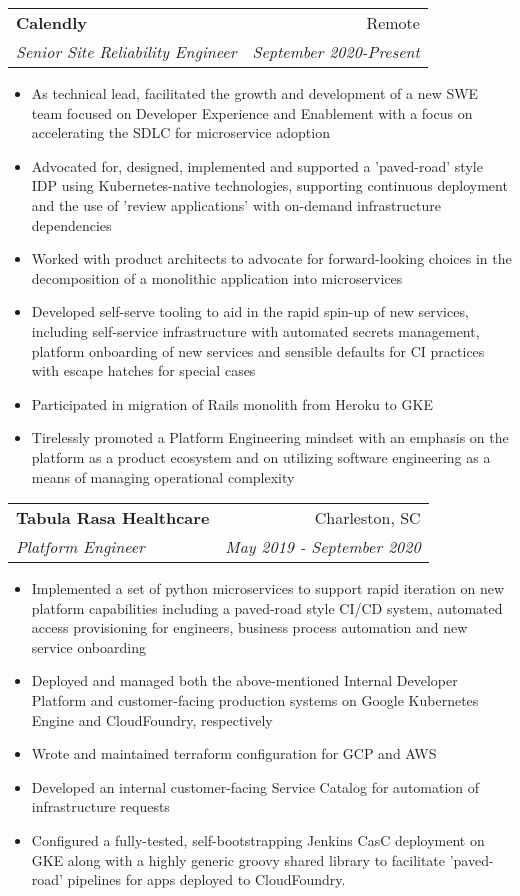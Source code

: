 \documentclass[letterpaper,11pt]{article}
\makeatletter
\newcommand{\resumeItem}[2]{
  \item\small{
    \textbf{#1}{ #2 \vspace{-2pt}}
  }
}
\newcommand{\resumeSubheading}[4]{
  \vspace{-1pt}\item
    \begin{tabular*}{0.97\textwidth}{l@{\extracolsep{\fill}}r}
      \textbf{#1} & #2 \\
      \textit{\small#3} & \textit{\small #4} \\
    \end{tabular*}\vspace{-5pt}
}
\newcommand{\resumeItemListStart}{\begin{itemize}}
\newcommand{\resumeItemListEnd}{\end{itemize}\vspace{-5pt}}
\makeatother
\begin{document}
  \resumeSubheading
      {Calendly}{Remote}
      {Senior Site Reliability Engineer}{September 2020-Present}
      \resumeItemListStart
        \resumeItem{}
          { As technical lead, facilitated the growth and development of a new SWE team focused on Developer Experience and Enablement with a focus on accelerating the SDLC for microservice adoption}
        \resumeItem{}
          { Advocated for, designed, implemented and supported a 'paved-road' style IDP using Kubernetes-native technologies, supporting continuous deployment and the use of 'review applications' with on-demand infrastructure dependencies}
        \resumeItem{}
          { Worked with product architects to advocate for forward-looking choices in the decomposition of a monolithic application into microservices}
        \resumeItem{}
          { Developed self-serve tooling to aid in the rapid spin-up of new services, including self-service infrastructure with automated secrets management, platform onboarding of new services and sensible defaults for CI practices with escape hatches for special cases }
        \resumeItem{}
          { Participated in migration of Rails monolith from Heroku to GKE }
        \resumeItem{}
          { Tirelessly promoted a Platform Engineering mindset with an emphasis on the platform as a product ecosystem and on utilizing software engineering as a means of managing operational complexity}
      \resumeItemListEnd

  \resumeSubheading
      {Tabula Rasa Healthcare}{Charleston, SC}
      {Platform Engineer}{May 2019 - September 2020}
      \resumeItemListStart
        \resumeItem{}
          { Implemented a set of python microservices to support rapid iteration on new platform capabilities including a paved-road style CI/CD system, automated access provisioning for engineers, business process automation and new service onboarding}
        \resumeItem{}
          { Deployed and managed both the above-mentioned Internal Developer Platform and customer-facing production systems on Google Kubernetes Engine and CloudFoundry, respectively}
        \resumeItem{}
          { Wrote and maintained terraform configuration for GCP and AWS}
        \resumeItem{}
          { Developed an internal customer-facing Service Catalog for automation of infrastructure requests}
        \resumeItem{}
          { Configured a fully-tested, self-bootstrapping Jenkins CasC deployment on GKE along with a highly generic groovy shared library to facilitate 'paved-road' pipelines for apps deployed to CloudFoundry.}
      \resumeItemListEnd
\end{document}

